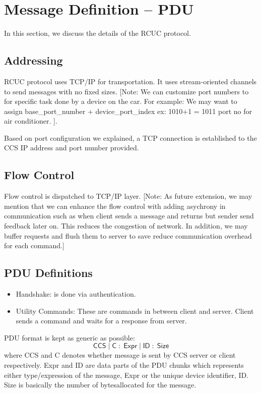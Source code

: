\section{Message Definition -- PDU}
\label{sec:pdus}

In this section, we discuss the details of the \textsf{RCUC} protocol.

\subsection{Addressing}
\label{sec:pdus:addr}
\textsf{RCUC} protocol uses TCP/IP for transportation. It uses stream-oriented channels to send messages with no fixed sizes. [Note: We can customize port numbers to for specific task done by a device on the car. For example: We may want to assign base\_port\_number + device\_port\_index ex: 1010+1 = 1011 port no for air conditioner. ].

Based on port configuration we explained, a TCP connection is established to the \textsf{CCS} IP address and port number provided.
\subsection{Flow Control}
\label{sec:pdus:flow}
Flow control is dispatched to TCP/IP layer. [Note: As future extension, we may mention that we can enhance the flow control with adding asychrony in communication such as when client sends a message  and returns but sender send feedback later on. This reduces the congestion of network. In addition, we may buffer requests and flush them to server to save reduce communication overhead for each command.]
 
\subsection{PDU Definitions}
\label{sec:pdus:pdu}
\begin{itemize}
\item \textsf{Handshake}: is done via authentication.
\item \textsf{Utility Commands}: These are commands in between client and server. Client sends a command and waits for a response from server.
  \end{itemize}


PDU format is kept as generic as possible:
\[\textsf{CCS} \; | \; \textsf{C} \; : \; \textsf{Expr} \; | \; \textsf{ID} \; : \; \textsf{Size} \]
where \textsf{CCS} and \textsf{C} denotes whether message is sent by \textsf{CCS} server or client respectively. \textsf{Expr} and \textsf{ID} are data parts of the PDU chunks which represents either type/expression of the message, \textsf{Expr} or the unique device identifier, \textsf{ID}. \textsf{Size} is basically the number of bytesallocated for the message.

